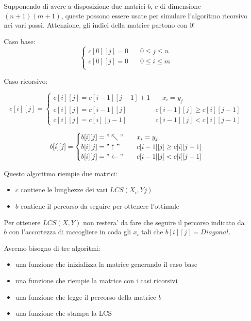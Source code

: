 Supponendo di avere a disposizione due matrici $b$, $c$ di dimensione $(n+1)(m+1)$, queste possono essere usate per simulare l'algoritmo ricorsivo nei vari passi.
Attenzione, gli indici della matrice partono con 0!

Caso base:
\[
    \begin{cases} 
        \text{$c[0][j]$} = 0 & \quad \text{$0 \leq j \leq n$} \\
        \text{$c[0][j]$} = 0 & \quad \text{$0 \leq i \leq m$} \\
    \end{cases}
\]

Caso ricorsivo:

\[
    c[i][j] =
    \begin{cases} 
        \text{$c[i][j] = c[i-1][j-1]$} + 1 & \quad \text{$x_{i} = y_{j}$} \\
        \text{$c[i][j] = c[i-1][j]$} \quad & \text{$c[i-1][j] \geq c[i][j-1]$} \\
        \text{$c[i][j] = c[i][j-1]$} \quad & \text{$c[i-1][j] < c[i][j-1]$}
    \end{cases}
\]

\[
    b[i][j] =
    \begin{cases} 
        \text{$b[i][j] = "\nwarrow"$} & \quad \text{$x_{i} = y_{j}$} \\
        \text{$b[i][j] = "\uparrow"$} & \quad \text{$c[i-1][j] \geq c[i][j-1]$} \\
        \text{$b[i][j] = "\leftarrow"$} & \quad \text{$c[i-1][j] < c[i][j-1]$}
    \end{cases}
\]

Questo algoritmo riempie due matrici:
\begin{itemize}
    \item $c$ contiene le lunghezze dei vari $LCS(X_{i}, Y{j})$
    \item $b$ contiene il percorso da seguire per ottenere l'ottimale
\end{itemize}

Per ottenere $LCS(X, Y)$ non restera' da fare che seguire il percorso indicato da $b$ con l'accortezza di raccogliere in coda gli $x_{i}$ tali che $b[i][j] = Diagonal$.

Avremo bisogno di tre algoritmi:
\begin{itemize}
    \item una funzione che inizializza la matrice generando il caso base
    \item una funzione che riempie la matrice con i casi ricorsivi
    \item una funzione che legge il percorso della matrice $b$
    \item una funzione che stampa la LCS
\end{itemize}

